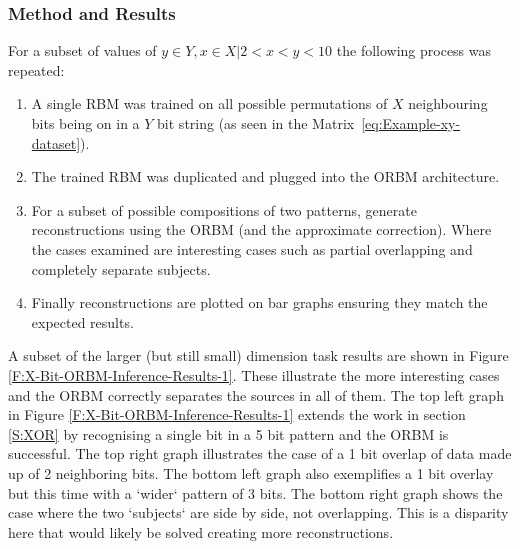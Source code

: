 \subsubsection{Method and Results}

For a subset of values of $y \in Y, x \in X | 2 < x < y < 10$ the following process was repeated:

\begin{enumerate}
  \item A single RBM was trained on all possible permutations of $X$ neighbouring bits being on in a $Y$ bit string (as seen in the Matrix~\ref{eq:Example-xy-dataset}).
  \item The trained RBM was duplicated and plugged into the ORBM architecture.
  \item For a subset of possible compositions of two patterns, generate reconstructions using the ORBM (and the approximate correction). Where the cases examined are interesting cases such as partial overlapping and completely separate subjects.
  \item Finally reconstructions are plotted on bar graphs ensuring they match the expected results.
\end{enumerate}

A subset of the larger (but still small) dimension task results are shown in Figure \ref{F:X-Bit-ORBM-Inference-Results-1}. These illustrate the more interesting cases and the ORBM correctly separates the sources in all of them. The top left graph in Figure \ref{F:X-Bit-ORBM-Inference-Results-1} extends the work in section \ref{S:XOR} by recognising a single bit in a 5 bit pattern and the ORBM is successful. The top right graph illustrates the case of a 1 bit overlap of data made up of 2 neighboring bits. The bottom left graph also exemplifies a 1 bit overlay but this time with a `wider` pattern of 3 bits. The bottom right graph shows the case where the two `subjects` are side by side, not overlapping. This is a disparity here that would likely be solved creating more reconstructions.

